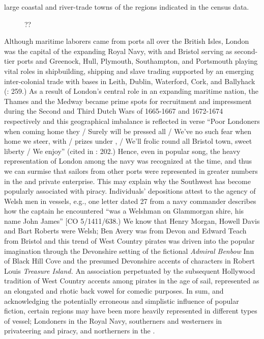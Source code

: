 large coastal and river-trade towns of the regions indicated in the census data. 

\begin{figure}
 \caption{??}

\end{figure}

Although maritime laborers came from ports all over the British Isles, London was the capital of the expanding Royal Navy, with  and Bristol serving as second-tier ports and Greenock, Hull, Plymouth, Southampton, and Portsmouth playing vital roles in shipbuilding,  shipping and slave trading supported by an emerging inter-colonial trade with bases in Leith, Dublin, Waterford, Cork, and Ballyhack (\citealt{Jarvis2010}: 259.) As a result of London’s central role in an expanding maritime nation, the Thames and the Medway became prime spots for recruitment and impressment during the Second and Third Dutch Wars of 1665-1667 and 1672-1674 respectively \citep[201,]{Earle1998} and this geographical imbalance is reflected in verse “Poor Londoners when coming home they / Surely will be pressed all / We’ve no such fear when home we steer, with / prizes under , / We’ll frolic round all Bristol town, sweet liberty / We enjoy” (cited in \citealt{Earle1998}: 202.) Hence, even in popular song, the heavy representation of London among the navy was recognized at the time, and thus we can surmise that sailors from other ports were represented in greater numbers in the  and private enterprise. This may explain why the Southwest has become popularly associated with piracy. Individuals’ depositions attest to the agency of Welsh men in  vessels, e.g., one letter dated 27 \citealt{July1699} from a navy commander describes how the  captain he encountered “was a Welshman on Glammorgan shire, his name John James” [CO 5/1411/638.) We know that Henry Morgan, Howell Davis and Bart Roberts were Welsh; Ben Avery was from Devon and Edward Teach from Bristol \citep[328,]{Bicheno2012} and this trend of West Country pirates was driven into the popular imagination through the Devonshire setting of the fictional \textit{Admiral Benbow} Inn of Black Hill Cove and the presumed Devonshire accents of characters in Robert Louis  \textit{Treasure Island.} An association perpetuated by the subsequent Hollywood tradition of West Country accents among pirates in the age of sail, represented as an elongated and rhotic back vowel for comedic purposes. In sum, and acknowledging the potentially erroneous and simplistic influence of popular fiction, certain regions may have been more heavily represented in different types of vessel; Londoners in the Royal Navy, southerners and westerners in privateering and piracy, and northerners in the . 

